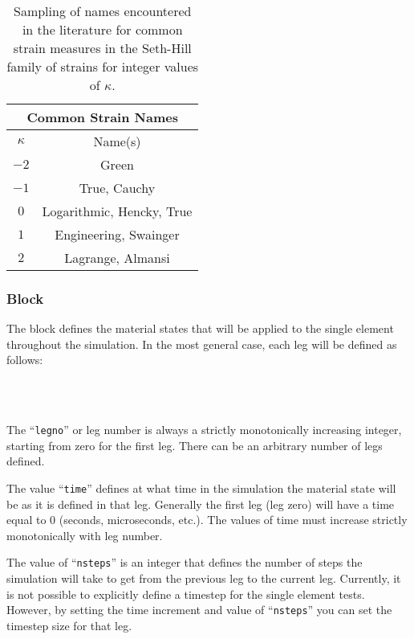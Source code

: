 \documentclass[11pt]{article}
\newcommand{\levelo}{\indent\hspace{.2in}}
\newcommand{\levelt}{\indent\hspace{.4in}}
\newcommand{\legsblock}{\Orange{\texttt{legs}}}
\newcommand{\nsteps}{\texttt{nsteps}}
\newcommand{\tim}{\texttt{time}}
\newcommand{\legno}{\texttt{legno}}
\begin{document}
\begin{table}[!htb]
  \centering
  \begin{tabular}{|c|c|}
    \hline
    \multicolumn{2}{|c|}{Common Strain Names} \\
    \hline
    $\kappa$ & Name(s) \\ \hline
    $-2$ & Green \\
    $-1$ & True, Cauchy \\
    $0$ & Logarithmic, Hencky, True \\
    $1$ & Engineering, Swainger \\
    $2$ & Lagrange, Almansi\\
    \hline
  \end{tabular}
  \caption{Sampling of names encountered in the literature for common strain
    measures in the Seth-Hill family of strains for integer values of $\kappa$.
    \label{table:sethhill}}
\end{table}

\subsubsection{\legsblock{} Block}
The \legsblock{} block defines the material states that will be applied to the
single element throughout the simulation. In the most general case, each leg will
be defined as follows:

\levelo{}\\
\levelt{}\\
\levelo{}

The ``\legno{}'' or leg number is always a strictly monotonically increasing
integer, starting from zero for the first leg. There can be an arbitrary number
of legs defined.

The value ``\tim{}'' defines at what time in the simulation the material state will
be as it is defined in that leg. Generally the first leg (leg zero) will have a
time equal to 0 (seconds, microseconds, etc.). The values of time must increase
strictly monotonically with leg number.

The value of ``\nsteps{}'' is an integer that defines the number of steps the
simulation will take to get from the previous leg to the current leg. Currently,
it is not possible to explicitly define a timestep for the single element tests.
However, by setting the time increment and value of ``\nsteps{}'' you can set the
timestep size for that leg.
\end{document}
